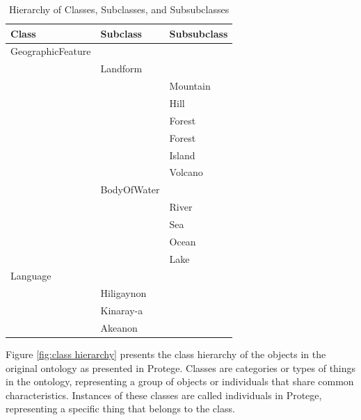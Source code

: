 \begin{table}[h]
    \centering
    \begin{tabular}{|l|l|l|}
        \hline
        \textbf{Class} & \textbf{Subclass} & \textbf{Subsubclass} \\ \hline
        GeographicFeature &  &  \\ \hline
         & Landform &  \\ \hline
         &  & Mountain \\ \hline
         &  & Hill \\ \hline
         &  & Forest \\ \hline
         &  & Forest \\ \hline
         &  & Island \\ \hline
         &  & Volcano \\ \hline
         & BodyOfWater &  \\ \hline
         &  & River \\ \hline
         &  & Sea \\ \hline
         &  & Ocean \\ \hline
         &  & Lake \\ \hline
        Language &  &  \\ \hline
         &   Hiligaynon & \\ \hline
         &   Kinaray-a & \\ \hline
         &   Akeanon & \\ \hline
        \end{tabular}
    \caption{Hierarchy of Classes, Subclasses, and Subsubclasses}
    \label{tab:class-subclass}
\end{table}

Figure \ref{fig:class hierarchy} presents the class hierarchy of the objects in the original ontology as presented in Protege. Classes are categories or types of things in the ontology, representing a group of objects or individuals that share common characteristics. Instances of these classes are called individuals in Protege, representing a specific thing that belongs to the class. 

